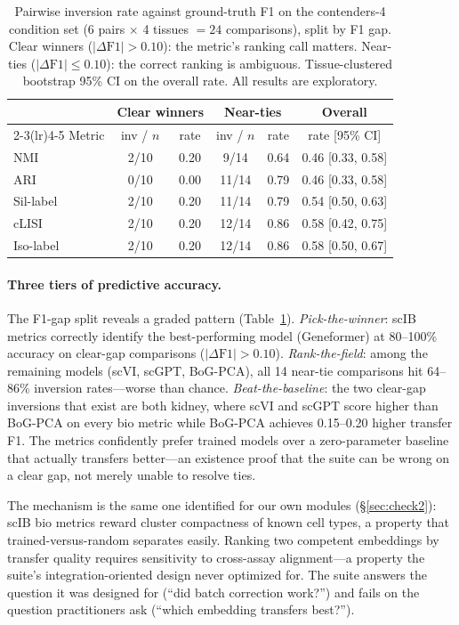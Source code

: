 \documentclass[9pt,lineno]{elife}
\begin{document}
\begin{table}[t]
\centering
\caption{Pairwise inversion rate against ground-truth F1 on the contenders-4 condition set (6 pairs $\times$ 4 tissues $= 24$ comparisons), split by F1 gap. Clear winners ($|\Delta\text{F1}| > 0.10$): the metric's ranking call matters. Near-ties ($|\Delta\text{F1}| \leq 0.10$): the correct ranking is ambiguous. Tissue-clustered bootstrap 95\% CI on the overall rate. All results are exploratory.}
\label{tab:scib_inversions}
\small
\begin{tabular}{@{}lccccc@{}}
\toprule
 & \multicolumn{2}{c}{Clear winners} & \multicolumn{2}{c}{Near-ties} & Overall \\
\cmidrule(lr){2-3}\cmidrule(lr){4-5}
Metric & inv / $n$ & rate & inv / $n$ & rate & rate [95\% CI] \\
\midrule
NMI       & 2/10 & 0.20 & 9/14  & 0.64 & 0.46 [0.33, 0.58] \\
ARI       & 0/10 & 0.00 & 11/14 & 0.79 & 0.46 [0.33, 0.58] \\
Sil-label & 2/10 & 0.20 & 11/14 & 0.79 & 0.54 [0.50, 0.63] \\
cLISI     & 2/10 & 0.20 & 12/14 & 0.86 & 0.58 [0.42, 0.75] \\
Iso-label & 2/10 & 0.20 & 12/14 & 0.86 & 0.58 [0.50, 0.67] \\
\bottomrule
\end{tabular}
\end{table}

\paragraph{Three tiers of predictive accuracy.} The F1-gap split reveals a graded pattern (Table~\ref{tab:scib_inversions}). \emph{Pick-the-winner}: scIB metrics correctly identify the best-performing model (Geneformer) at 80--100\% accuracy on clear-gap comparisons ($|\Delta\text{F1}| > 0.10$). \emph{Rank-the-field}: among the remaining models (scVI, scGPT, BoG-PCA), all 14 near-tie comparisons hit 64--86\% inversion rates---worse than chance. \emph{Beat-the-baseline}: the two clear-gap inversions that exist are both kidney, where scVI and scGPT score higher than BoG-PCA on every bio metric while BoG-PCA achieves 0.15--0.20 higher transfer F1. The metrics confidently prefer trained models over a zero-parameter baseline that actually transfers better---an existence proof that the suite can be wrong on a clear gap, not merely unable to resolve ties.

The mechanism is the same one identified for our own modules (\S\ref{sec:check2}): scIB bio metrics reward cluster compactness of known cell types, a property that trained-versus-random separates easily. Ranking two competent embeddings by transfer quality requires sensitivity to cross-assay alignment---a property the suite's integration-oriented design never optimized for. The suite answers the question it was designed for (``did batch correction work?'') and fails on the question practitioners ask (``which embedding transfers best?'').
\end{document}
